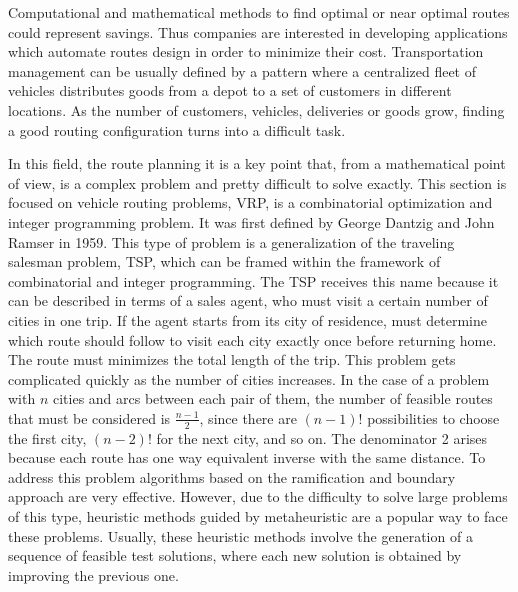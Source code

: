 Computational and mathematical methods to find optimal or near optimal routes could represent savings. Thus companies are interested in developing applications which automate routes design in order to minimize their cost. Transportation management can be usually defined by a pattern where a centralized fleet of vehicles distributes goods from a depot to a set of customers in different locations. As the number of customers, vehicles, deliveries or goods grow, finding a good routing configuration turns into a difficult task.

In this field, the route planning it is a key point that, from a mathematical point of view, is a complex problem and pretty difficult to solve exactly. 
This section is focused on vehicle routing problems, VRP, is a combinatorial optimization and integer programming problem. It was first defined by George Dantzig and John Ramser in 1959. This type of problem is a generalization of the traveling salesman problem, TSP, which can be framed within the framework of combinatorial and integer programming. The TSP receives this name because it can be described in terms of a sales agent, who must visit a certain number of cities in one trip. If the agent starts from its city of residence, must determine which route should follow to visit each city exactly once before returning home. The route must minimizes the total length of the trip. This problem gets complicated quickly as the number of cities increases. In the case of a problem with $n$ cities and arcs between each pair of them, the number of feasible routes that must be considered is $\frac{n-1}{2}$, since there are $(n-1)!$ possibilities to choose the first city, $(n-2)!$ for the next city, and so on. The denominator 2 arises because each route has one way equivalent inverse with the same distance. To address this problem algorithms based on the ramification and boundary approach are very effective. However, due to the difficulty to solve large problems of this type, heuristic methods guided by metaheuristic are a popular way to face these problems. Usually, these heuristic methods involve the generation of a sequence of feasible test solutions, where each new solution is obtained by improving the previous one.

